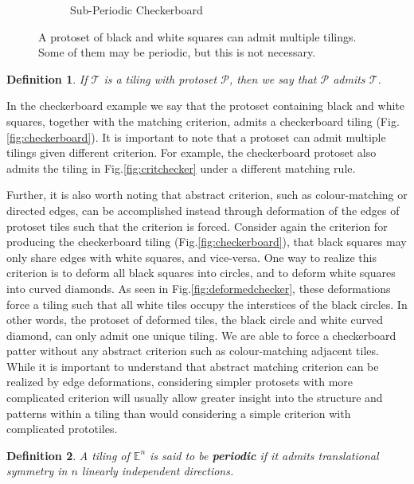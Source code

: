 \documentclass[]{article}
\newtheorem{mydef}{Definition}
\begin{document}
\begin{figure}[H]
\begin{subfigure}[t]{0.4\textwidth}
    \caption{Sub-Periodic Checkerboard}
    \label{fig:aperiodicchecker}
\end{subfigure} 
\hspace*{\fill}
\label{fig:checker}
\caption{A protoset of black and white squares can admit multiple tilings. Some of them may be periodic, but this is not necessary.}
\end{figure}

\begin{mydef}
If $\mathcal{T}$ is a tiling with protoset $\mathcal{P}$, then we say that $\mathcal{P}$ admits $\mathcal{T}$.
\end{mydef}

In the checkerboard example we say that the protoset containing black and white squares, together with the matching criterion, admits a checkerboard tiling (Fig.\ref{fig:checkerboard}). It is important to note that a protoset can admit multiple tilings given different criterion. For example, the checkerboard protoset also admits the tiling in Fig.\ref{fig:critchecker} under a different matching rule. 

Further, it is also worth noting that abstract criterion, such as colour-matching or directed edges, can be accomplished instead through deformation of the edges of protoset tiles such that the criterion is forced. Consider again the criterion for producing the checkerboard tiling (Fig.\ref{fig:checkerboard}), that black squares may only share edges with white squares, and vice-versa. One way to realize this criterion is to deform all black squares into circles, and to deform white squares into curved diamonds. As seen in Fig.\ref{fig:deformedchecker}, these deformations force a tiling such that all white tiles occupy the interstices of the black circles. In other words, the protoset of deformed tiles, the black circle and white curved diamond, can only admit one unique tiling. We are able to force a checkerboard patter without any abstract criterion such as colour-matching adjacent tiles. While it is important to understand that abstract matching criterion can be realized by edge deformations, considering simpler protosets with more complicated criterion will usually allow greater insight into the structure and patterns within a tiling than would considering a simple criterion with complicated prototiles. 

\begin{mydef}
A tiling of  $\mathbb{E}^n$ is said to be \textbf{periodic} if it admits translational symmetry in $n$ linearly independent directions.
\end{mydef}
\end{document}
